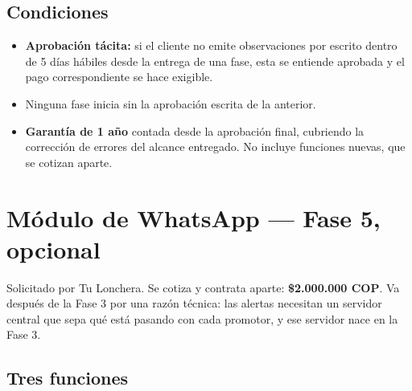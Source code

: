\documentclass[11pt,a4paper]{article}
\begin{document}
\vspace{14pt}

\subsection*{Condiciones}
\begin{itemize}
    \item \textbf{Aprobación tácita:} si el cliente no emite observaciones por escrito
    dentro de 5 días hábiles desde la entrega de una fase, esta se entiende
    aprobada y el pago correspondiente se hace exigible.
    \item Ninguna fase inicia sin la aprobación escrita de la anterior.
    \item \textbf{Garantía de 1 año} contada desde la aprobación final, cubriendo
    la corrección de errores del alcance entregado. No incluye funciones nuevas,
    que se cotizan aparte.
\end{itemize}

\section{Módulo de WhatsApp --- Fase 5, opcional}\label{sec:whatsapp}

Solicitado por Tu Lonchera. Se cotiza y contrata aparte: \textbf{\$2.000.000 COP}.
Va después de la Fase 3 por una razón técnica: las alertas necesitan un servidor
central que sepa qué está pasando con cada promotor, y ese servidor nace en la Fase 3.

\subsection*{Tres funciones}
\end{document}
